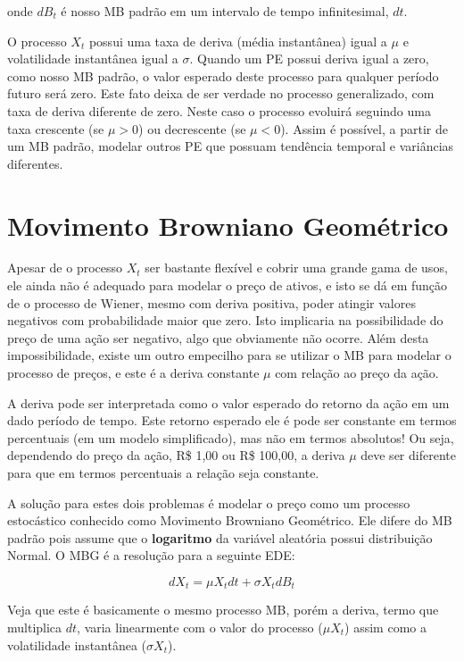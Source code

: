 \documentclass[]{book}
\theoremstyle{definition}
\theoremstyle{definition}
\theoremstyle{definition}
\theoremstyle{remark}
\begin{document}
onde \(dB_t\) é nosso MB padrão em um intervalo de tempo infinitesimal, \(dt\).

O processo \(X_t\) possui uma taxa de deriva (média instantânea) igual a \(\mu\) e volatilidade instantânea igual a \(\sigma\). Quando um PE possui deriva igual a zero, como nosso MB padrão, o valor esperado deste processo para qualquer período futuro será zero. Este fato deixa de ser verdade no processo generalizado, com taxa de deriva diferente de zero. Neste caso o processo evoluirá seguindo uma taxa crescente (se \(\mu > 0\)) ou decrescente (se \(\mu < 0\)). Assim é possível, a partir de um MB padrão, modelar outros PE que possuam tendência temporal e variâncias diferentes.

\hypertarget{mbg}{%
\section{Movimento Browniano Geométrico}\label{mbg}}

Apesar de o processo \(X_t\) ser bastante flexível e cobrir uma grande gama de usos, ele ainda não é adequado para modelar o preço de ativos, e isto se dá em função de o processo de Wiener, mesmo com deriva positiva, poder atingir valores negativos com probabilidade maior que zero. Isto implicaria na possibilidade do preço de uma ação ser negativo, algo que obviamente não ocorre. Além desta impossibilidade, existe um outro empecilho para se utilizar o MB para modelar o processo de preços, e este é a deriva constante \(\mu\) com relação ao preço da ação.

A deriva pode ser interpretada como o valor esperado do retorno da ação em um dado período de tempo. Este retorno esperado ele é pode ser constante em termos percentuais (em um modelo simplificado), mas não em termos absolutos! Ou seja, dependendo do preço da ação, R\$ 1,00 ou R\$ 100,00, a deriva \(\mu\) deve ser diferente para que em termos percentuais a relação seja constante.

A solução para estes dois problemas é modelar o preço como um processo estocástico conhecido como Movimento Browniano Geométrico. Ele difere do MB padrão pois assume que o \textbf{logaritmo} da variável aleatória possui distribuição Normal. O MBG é a resolução para a seguinte EDE:

\begin{equation}
dX_t = \mu X_t dt + \sigma X_t dB_t
\label{eq:mbg}
\end{equation}

Veja que este é basicamente o mesmo processo MB, porém a deriva, termo que multiplica \(dt\), varia linearmente com o valor do processo (\(\mu X_t\)) assim como a volatilidade instantânea (\(\sigma X_t\)).
\end{document}
